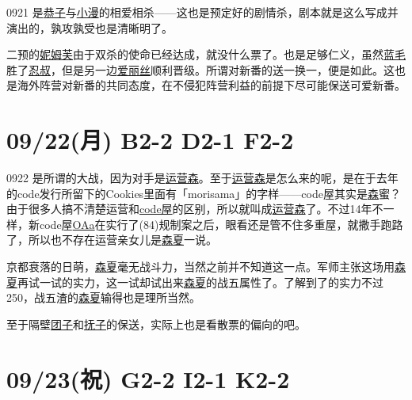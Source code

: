 0921 是\uline{恭子}与\uline{小漫}的相爱相杀——这也是预定好的剧情杀，剧本就是这么写成并演出的，孰攻孰受也是清晰明了。

二预的\uline{妮姆芙}由于双杀的使命已经达成，就没什么票了。也是足够仁义，虽然\uline{蓝毛}胜了\uline{忍叔}，但是另一边\uline{爱丽丝}顺利晋级。所谓对新番的送一换一，便是如此。这也是海外阵营对新番的共同态度，在不侵犯阵营利益的前提下尽可能保送可爱新番。

\section{09/22(月) B2-2 D2-1 F2-2}


0922 是所谓的大战，因为对手是\uline{运营森}。至于\uline{运营森}是怎么来的呢，是在于去年的code发行所留下的Cookies里面有「morisama」的字样——code屋其实是\uline{森}蜜？由于很多人搞不清楚运营和\uline{code屋}的区别，所以就叫成\uline{运营森}了。不过14年不一样，新code屋\uline{OAa}在实行了(84)规制案之后，眼看还是管不住多重屋，就撒手跑路了，所以也不存在运营亲女儿是\uline{森夏}一说。

京都衰落的日萌，\uline{森夏}毫无战斗力，当然之前并不知道这一点。军师主张这场用\uline{森夏}再试一试的实力，这一试却试出来\uline{森夏}的战五属性了。了解到了的实力不过250，战五渣的\uline{森夏}输得也是理所当然。

至于隔壁\uline{团子}和\uline{抚子}的保送，实际上也是看散票的偏向的吧。

\section{09/23(祝) G2-2 I2-1 K2-2}


